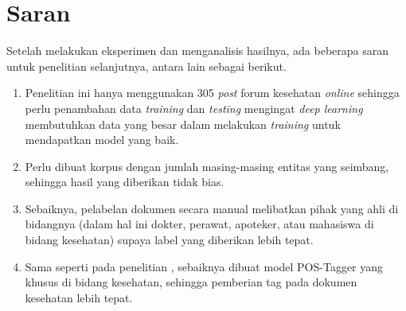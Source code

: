 \section{Saran}
Setelah melakukan eksperimen dan menganalisis hasilnya, ada beberapa saran untuk penelitian selanjutnya, antara lain sebagai berikut.

\begin{enumerate}
  \item Penelitian ini hanya menggunakan 305 \textit{post} forum kesehatan \textit{online} sehingga perlu penambahan data \textit{training} dan \textit{testing} mengingat \textit{deep learning} membutuhkan data yang besar dalam melakukan \textit{training} untuk mendapatkan model yang baik.

  \item Perlu dibuat korpus dengan jumlah masing-masing entitas yang seimbang, sehingga hasil yang diberikan tidak bias.
  
  \item Sebaiknya, pelabelan dokumen secara manual melibatkan pihak yang ahli di bidangnya (dalam hal ini dokter, perawat, apoteker, atau mahasiswa di bidang kesehatan) supaya label yang diberikan lebih tepat.
  
  \item Sama seperti pada penelitian \cite{skripsiKakRadit}, sebaiknya dibuat model POS-Tagger yang khusus di bidang kesehatan, sehingga pemberian tag pada dokumen kesehatan lebih tepat.

\end{enumerate}